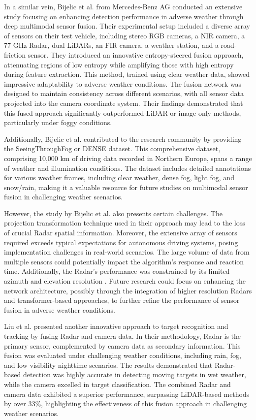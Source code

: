 \documentclass[report.tex]{subfiles}
\begin{document}
    In a similar vein, Bijelic et al. \cite{bijelic2020seeing} from Mercedes-Benz AG conducted an extensive study focusing on enhancing detection performance in adverse weather through deep multimodal sensor fusion. Their experimental setup included a diverse array of sensors on their test vehicle, including stereo RGB cameras, a NIR camera, a 77 GHz Radar, dual LiDARs, an FIR camera, a weather station, and a road-friction sensor. They introduced an innovative entropy-steered fusion approach, attenuating regions of low entropy while amplifying those with high entropy during feature extraction. This method, trained using clear weather data, showed impressive adaptability to adverse weather conditions. The fusion network was designed to maintain consistency across different scenarios, with all sensor data projected into the camera coordinate system. Their findings demonstrated that this fused approach significantly outperformed LiDAR or image-only methods, particularly under foggy conditions.

    Additionally, Bijelic et al. \cite{bijelic2020seeing} contributed to the research community by providing the SeeingThroughFog or DENSE dataset. This comprehensive dataset, comprising 10,000 km of driving data recorded in Northern Europe, spans a range of weather and illumination conditions. The dataset includes detailed annotations for various weather frames, including clear weather, dense fog, light fog, and snow/rain, making it a valuable resource for future studies on multimodal sensor fusion in challenging weather scenarios.

    However, the study by Bijelic et al. \cite{bijelic2020seeing} also presents certain challenges. The projection transformation technique used in their approach may lead to the loss of crucial Radar spatial information. Moreover, the extensive array of sensors required exceeds typical expectations for autonomous driving systems, posing implementation challenges in real-world scenarios. The large volume of data from multiple sensors could potentially impact the algorithm's response and reaction time. Additionally, the Radar's performance was constrained by its limited azimuth and elevation resolution \cite{zhang2023perception}. Future research could focus on enhancing the network architecture, possibly through the integration of higher resolution Radars and transformer-based approaches, to further refine the performance of sensor fusion in adverse weather conditions.

    Liu et al. \cite{liu2021robust} presented another innovative approach to target recognition and tracking by fusing Radar and camera data. In their methodology, Radar is the primary sensor, complemented by camera data as secondary information. This fusion was evaluated under challenging weather conditions, including rain, fog, and low visibility nighttime scenarios. The results demonstrated that Radar-based detection was highly accurate in detecting moving targets in wet weather, while the camera excelled in target classification. The combined Radar and camera data exhibited a superior performance, surpassing LiDAR-based methods by over 33\%, highlighting the effectiveness of this fusion approach in challenging weather scenarios.
\end{document}
